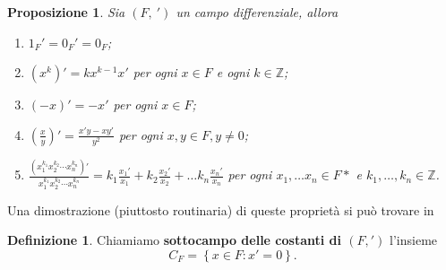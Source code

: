 \documentclass[10pt,oneside]{article}
\theoremstyle{definition}
\theoremstyle{plain}
\theoremstyle{definition}
\newtheorem{dfn}{Definizione}
\theoremstyle{plain}
\newtheorem{prop}{Proposizione}
\theoremstyle{plain}
\newcommand{\N}{\mathbb{N}}
\newcommand{\Z}{\mathbb{Z}}
\begin{document}
\begin{prop}\label{prop:proprietà deriv}
Sia $(F,\ ')$ un campo differenziale, allora
\begin{enumerate}
\item $1_F'=0_F'=0_F$;
\item $(x^k)'=k x^{k-1}x'$ per ogni $x \in F$ e ogni $k \in \Z$;
\item $(-x)'=-x'$ per ogni $x \in F$;
\item $\left(\frac{x}{y} \right)' = \frac{x'y-xy'}{y^2} $ per ogni $x,y \in F, y \neq 0$;
\item $\frac{\left(x_1^{k_1}x_2^{k_2} \cdots x_n^{k_n} \right)'}{x_1^{k_1}x_2^{k_2} \cdots x_n^{k_n}} = k_1 \frac{x_1'}{x_1}+ k_2 \frac{x_2'}{x_2} + \dots k_n \frac{x_n'}{x_n}$ \quad per ogni $x_1,\dots x_n \in F*$ e $k_1,\dots, k_n \in \Z$.
\end{enumerate}
\end{prop}
Una dimostrazione (piuttosto routinaria) di queste proprietà si può trovare in~\cite{Delel}
%
%
%
%
%
%
%
%
\begin{dfn} 
Chiamiamo  \textbf{sottocampo delle costanti di $(F,')$} l'insieme
\[ C_F=\left\{x \in F : x'=0\right\}.\]
\end{dfn}
\end{document}
